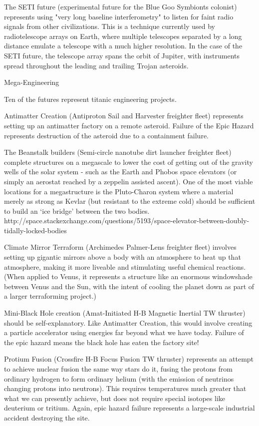 \documentclass[a4paper]{book}
\begin{document}
The SETI future (experimental future for the Blue Goo Symbionts colonist) represents using "very long baseline interferometry" to listen for faint radio signals from other civilizations. This is a technique currently used by radiotelescope arrays on Earth, where multiple telescopes separated by a long distance emulate a telescope with a much higher resolution. In the case of the SETI future, the telescope array spans the orbit of Jupiter, with instruments spread throughout the leading and trailing Trojan asteroids.

Mega-Engineering

Ten of the futures represent titanic engineering projects.

Antimatter Creation (Antiproton Sail and Harvester freighter fleet) represents setting up an antimatter factory on a remote asteroid. Failure of the Epic Hazard represents destruction of the asteroid due to a containment failure.

The Beanstalk builders (Semi-circle nanotube dirt launcher freighter fleet) complete structures on a megascale to lower the cost of getting out of the gravity wells of the solar system - such as the Earth and Phobos space elevators (or simply an aerostat reached by a zeppelin assisted ascent). One of the most viable locations for a megastructure is the Pluto-Charon system where a material merely as strong as Kevlar (but resistant to the extreme cold) should be sufficient to build an ‘ice bridge’ between the two bodies. http://space.stackexchange.com/questions/5193/space-elevator-between-doubly-tidally-locked-bodies

Climate Mirror Terraform (Archimedes Palmer-Lens freighter fleet) involves setting up gigantic mirrors above a body with an atmosphere to heat up that atmosphere, making it more liveable and stimulating useful chemical reactions. (When applied to Venus, it represents a structure like an enormous windowshade between Venus and the Sun, with the intent of cooling the planet down as part of a larger terraforming project.)

Mini-Black Hole creation (Amat-Initiated H-B Magnetic Inertial TW thruster) should be self-explanatory. Like Antimatter Creation, this would involve creating a particle accelerator using energies far beyond what we have today. Failure of the epic hazard means the black hole has eaten the factory site!

Protium Fusion (Crossfire H-B Focus Fusion TW thruster) represents an attempt to achieve nuclear fusion the same way stars do it, fusing the protons from ordinary hydrogen to form ordinary helium (with the emission of neutrinos changing protons into neutrons). This requires temperatures much greater that what we can presently achieve, but does not require special isotopes like deuterium or tritium. Again, epic hazard failure represents a large-scale industrial accident destroying the site.
\end{document}

